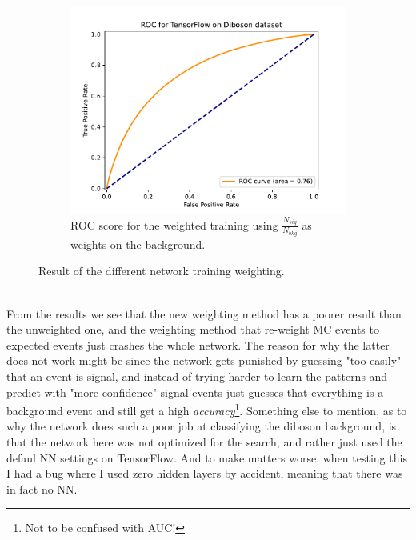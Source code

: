 \documentclass[14pt, a4paper]{book}
\begin{document}
\begin{figure}[!ht]
\begin{subfigure}[b]{0.49\textwidth}
        \centering
        \includegraphics[width=1\textwidth]{Balanced/ROC.pdf}
        \caption{ROC score for the weighted training using $\frac{N_{sig}}{N_{bkg}}$ as weights on the background.}\label{fig:DibosonROCW}
     \end{subfigure}
	\caption{Result of the different network training weighting.}\label{fig:DibosonROC}
\end{figure}
\graphicspath{{../../figures/}}
\\From the results we see that the new weighting method has a poorer result than the unweighted one, and the weighting method that re-weight MC events to expected events just crashes the whole network. 
The reason for why the latter does not work might be since the network gets punished by guessing "too easily" that an event is signal, and instead of trying harder to learn the patterns and predict with "more confidence" 
signal events just guesses that everything is a background event and still get a high \textit{accuracy}\footnote{Not to be confused with AUC!}. Something else to mention, as to why the network does such a poor job at classifying the diboson background, is that the network here was not optimized for the search, and rather just used the 
defaul NN settings on TensorFlow. And to make matters worse, when testing this I had a bug where I used zero hidden layers by accident, meaning that there was in fact no NN.


\clearpage
\end{document}
